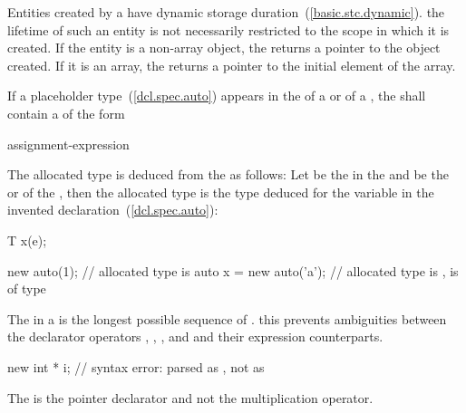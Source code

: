 %
Entities created by a  have dynamic storage
duration~(\ref{basic.stc.dynamic}).
\enternote 
{}%
the lifetime of such an entity is not necessarily restricted to the
scope in which it is created.
\exitnote 
If the entity is a non-array object, the 
returns a pointer to the object created. If it is an array, the
 returns a pointer to the initial element of
the array.

\pnum
If a placeholder type~(\ref{dcl.spec.auto}) appears in the
 of a  or
 of a ,
the  shall contain a
 of the form

\begin{ncsimplebnf}
\terminal{(} assignment-expression \terminal{)}
\end{ncsimplebnf}

The allocated type is deduced from the  as
follows: Let  be the  in the  and
 be the  or  of
the , then the allocated type is the type
deduced for the variable  in the invented
declaration~(\ref{dcl.spec.auto}):

\begin{codeblock}
T x(e);
\end{codeblock}

\enterexample
\begin{codeblock}
new auto(1);                    // allocated type is 
auto x = new auto('a');         // allocated type is ,  is of type 
\end{codeblock}
\exitexample

\pnum
The  in a  is the longest
possible sequence of .
\enternote 
this prevents ambiguities between the declarator operators \tcode{\&}, \tcode{\&\&},
\tcode{*}, and \tcode{[]} and their expression counterparts.
\exitnote 
\enterexample 

\begin{codeblock}
new int * i;                    // syntax error: parsed as , not as 
\end{codeblock}
The \tcode{*} is the pointer declarator and not the multiplication
operator.
\exitexample 

